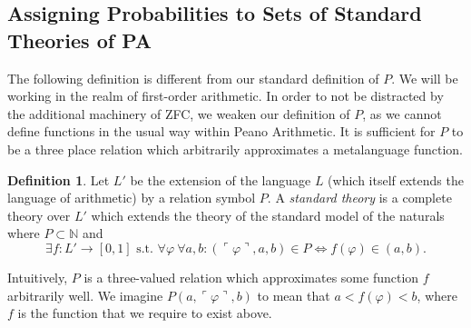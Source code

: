 \documentclass[12pt]{article}
\newcommand{\vp}{\varphi}
\theoremstyle{plain}
\theoremstyle{definition}
\newtheorem{definition}[theorem]{Definition}
\theoremstyle{remark}
\begin{document}
\subsection{Assigning Probabilities to Sets of Standard Theories of PA}
The following definition is different from our standard definition of $P$. 
We will be working in the realm of first-order arithmetic.
In order to not be distracted by the additional machinery of ZFC, we weaken our definition of $P$, as we cannot define functions in the usual way within Peano Arithmetic.
It is sufficient for $P$ to be a three place relation which arbitrarily approximates a metalanguage function.
\begin{definition}
Let $L'$ be the extension of the language $L$ (which itself extends the language of arithmetic) by a relation symbol $P$.
A \emph{standard theory} is a complete theory over $L'$ which extends the theory of the standard model of the naturals where $P\subset\mathbb{N}$ and 
$$\exists f : L'\rightarrow[0, 1] \text{ s.t. } \forall \vp~\forall a, b: (\ulcorner \vp \urcorner, a, b) \in P \iff f(\vp) \in (a, b).$$
\end{definition}
Intuitively, $P$ is a three-valued relation which approximates some function $f$ arbitrarily well. We imagine $P( a,\ulcorner\varphi\urcorner, b)$ to mean that $a<f(\varphi)<b$, where $f$ is the function that we require to exist above.
\end{document}
